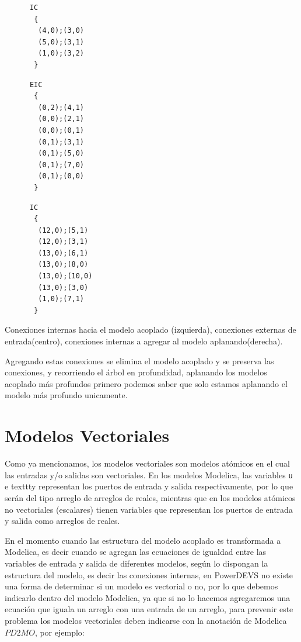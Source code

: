 \begin{itemize}
\begin{listing}
\begin{minipage}[t]{0.3\linewidth}
\begin{verbatim}
      IC
       {
        (4,0);(3,0)
        (5,0);(3,1)
        (1,0);(3,2)
       }
\end{verbatim}
\end{minipage}
\begin{minipage}[t]{0.3\linewidth}
\begin{verbatim}
      EIC
       {
        (0,2);(4,1)
        (0,0);(2,1)
        (0,0);(0,1)
        (0,1);(3,1)
        (0,1);(5,0)
        (0,1);(7,0)
        (0,1);(0,0)
       }
\end{verbatim}
\end{minipage}
\begin{minipage}[t]{0.3\linewidth}
\begin{verbatim}
      IC
       {
        (12,0);(5,1)
        (12,0);(3,1)
        (13,0);(6,1)
        (13,0);(8,0)
        (13,0);(10,0)
        (13,0);(3,0)
        (1,0);(7,1)
       }
\end{verbatim}
\end{minipage}
\label{lst:conexiones3}
\caption{Conexiones internas hacia el modelo acoplado (izquierda), conexiones externas de entrada(centro), conexiones internas a agregar al modelo aplanando(derecha).}
\end{listing}
\end{itemize}

	Agregando estas conexiones se elimina el modelo acoplado y se preserva las conexiones, y recorriendo el árbol en profundidad, aplanando los modelos 
	acoplado más profundos primero podemos saber que solo estamos aplanando el modelo más profundo unicamente.


\section{Modelos Vectoriales}
	Como ya mencionamos, los modelos vectoriales son modelos atómicos en el cual las entradas y/o salidas son vectoriales. En los modelos Modelica, 
	las variables \texttt{u} e texttt{y} representan los puertos de entrada y salida respectivamente, por lo que serán del tipo arreglo de arreglos de reales,
	mientras que en los modelos atómicos no vectoriales (escalares) tienen variables que representan los puertos de entrada y salida como arreglos de reales. 

	En el momento cuando las estructura del modelo acoplado es transformada a Modelica, es decir cuando se agregan las ecuaciones de igualdad entre las
	variables de entrada y salida de diferentes modelos, según lo dispongan la estructura del modelo, es decir las conexiones internas, en PowerDEVS 
	no existe una forma de determinar si un modelo es vectorial o no, por lo que debemos indicarlo dentro del modelo Modelica, ya que si no lo hacemos 
	agregaremos una ecuación que iguala un arreglo con una entrada de un arreglo, para prevenir este problema los modelos vectoriales deben indicarse 
	con la anotación de Modelica $PD2MO$, por ejemplo:

